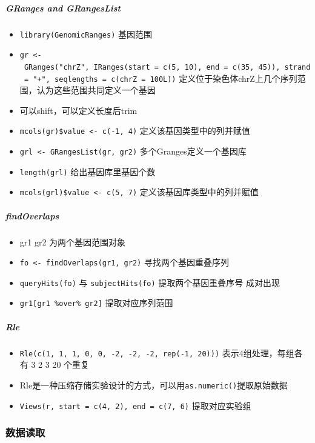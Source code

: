 \documentclass[
]{book}
\providecommand{\tightlist}{%
  \setlength{\itemsep}{0pt}\setlength{\parskip}{0pt}}
\begin{document}
\hypertarget{granges-and-grangeslist}{%
\subparagraph{GRanges and GRangesList}\label{granges-and-grangeslist}}

\begin{itemize}
\tightlist
\item
  \texttt{library(GenomicRanges)} 基因范围
\item
  \texttt{gr\ \textless{}-\ GRanges("chrZ",\ IRanges(start\ =\ c(5,\ 10),\ end\ =\ c(35,\ 45)),\ strand\ =\ "+",\ seqlengths\ =\ c(chrZ\ =\ 100L))} 定义位于染色体chrZ上几个序列范围，认为这些范围共同定义一个基因
\item
  可以shift，可以定义长度后trim
\item
  \texttt{mcols(gr)\$value\ \textless{}-\ c(-1,\ 4)} 定义该基因类型中的列并赋值
\item
  \texttt{grl\ \textless{}-\ GRangesList(gr,\ gr2)} 多个Granges定义一个基因库
\item
  \texttt{length(grl)} 给出基因库里基因个数
\item
  \texttt{mcols(grl)\$value\ \textless{}-\ c(5,\ 7)} 定义该基因库类型中的列并赋值
\end{itemize}

\hypertarget{findoverlaps}{%
\subparagraph{findOverlaps}\label{findoverlaps}}

\begin{itemize}
\tightlist
\item
  gr1 gr2 为两个基因范围对象
\item
  \texttt{fo\ \textless{}-\ findOverlaps(gr1,\ gr2)} 寻找两个基因重叠序列
\item
  \texttt{queryHits(fo)} 与 \texttt{subjectHits(fo)} 提取两个基因重叠序号 成对出现
\item
  \texttt{gr1{[}gr1\ \%over\%\ gr2{]}} 提取对应序列范围
\end{itemize}

\hypertarget{rle}{%
\subparagraph{Rle}\label{rle}}

\begin{itemize}
\tightlist
\item
  \texttt{Rle(c(1,\ 1,\ 1,\ 0,\ 0,\ -2,\ -2,\ -2,\ rep(-1,\ 20)))} 表示4组处理，每组各有 3 2 3 20 个重复
\item
  Rle是一种压缩存储实验设计的方式，可以用\texttt{as.numeric()}提取原始数据
\item
  \texttt{Views(r,\ start\ =\ c(4,\ 2),\ end\ =\ c(7,\ 6)} 提取对应实验组
\end{itemize}

\hypertarget{ux6570ux636eux8bfbux53d6}{%
\subsubsection{数据读取}\label{ux6570ux636eux8bfbux53d6}}
\end{document}
